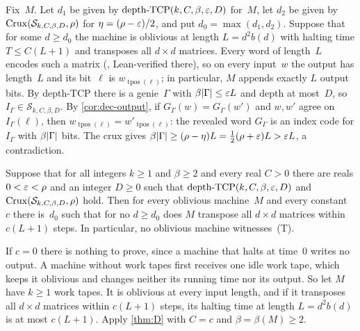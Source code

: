 \begin{informalproof}
Fix~$M$. Let $d_1$ be given by $\mathrm{depth}\text{-}\mathrm{TCP}(k,C,\beta,\varepsilon,D)$ for~$M$, let $d_2$ be given by
$\mathrm{Crux}(\mathcal S_{k,C,\beta,D},\rho)$ for $\eta=(\rho-\varepsilon)/2$, and put $d_0=\max(d_1,d_2)$. Suppose that for some
$d\ge d_0$ the machine is oblivious at length $L=d^2b(d)$ with halting time $T\le C(L+1)$ and transposes all
$d\times d$ matrices. Every word of length~$L$ encodes such a matrix (\cite[Lemma~2.5]{FirstPaper2026}, Lean-verified there), so on every input~$w$
the output has length~$L$ and its bit~$\ell$ is $w_{\operatorname{tpos}(\ell)}$; in particular, $M$ appends exactly
$L$ output bits. By depth-TCP there is a genie~$\Gamma$ with $\beta\lvert \Gamma \rvert\le\varepsilon L$ and depth at most~$D$, so
$I_\Gamma\in\mathcal S_{k,C,\beta,D}$. By \cref{cor:dec-output}, if $G_\Gamma(w)=G_\Gamma(w')$ and $w,w'$ agree on
$I_\Gamma(\ell)$, then $w_{\operatorname{tpos}(\ell)}=w'_{\operatorname{tpos}(\ell)}$: the revealed word $G_\Gamma$ is
an index code for $I_\Gamma$ with $\beta\lvert \Gamma \rvert$ bits. The crux gives
$\beta\lvert \Gamma \rvert\ge(\rho-\eta)L=\tfrac12(\rho+\varepsilon)L>\varepsilon L$, a contradiction.
\end{informalproof}

\begin{corollary}\label{cor:dec-obl}
\notformalized
Suppose that for all integers $k\ge1$ and $\beta\ge2$ and every real $C>0$ there are reals $0<\varepsilon<\rho$ and an
integer $D\ge0$ such that $\mathrm{depth}\text{-}\mathrm{TCP}(k,C,\beta,\varepsilon,D)$ and $\mathrm{Crux}(\mathcal S_{k,C,\beta,D},\rho)$
hold. Then for every oblivious machine~$M$ and every constant~$c$ there is~$d_0$ such that for no $d\ge d_0$ does $M$
transpose all $d\times d$ matrices within $c(L+1)$ steps. In particular, no oblivious machine witnesses~(T).
\end{corollary}

\begin{informalproof}
If $c=0$ there is nothing to prove, since a machine that halts at time~$0$ writes no output. A machine without work
tapes first receives one idle work tape, which keeps it oblivious and changes neither its running time nor its output.
So let $M$ have $k\ge1$ work tapes. It is oblivious at every input length, and if it transposes all $d\times d$ matrices
within $c(L+1)$ steps, its halting time at length $L=d^2b(d)$ is at most $c(L+1)$. Apply \cref{thm:D} with $C=c$ and
$\beta=\beta(M)\ge2$.
\end{informalproof}

